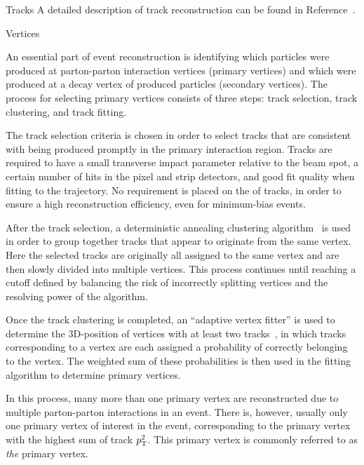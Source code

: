 \begin{section}{Tracks}
A detailed description of track reconstruction can be found in Reference~\cite{Chatrchyan:2014fea}.

\begin{subsection}{Vertices}

An essential part of event reconstruction is identifying which particles were produced at parton-parton interaction vertices (primary vertices) and which were produced at a decay vertex of produced particles (secondary vertices).
The process for selecting primary vertices consists of three steps: track selection, track clustering, and track fitting.

The track selection criteria is chosen in order to select tracks that are consistent with being produced promptly in the primary interaction region.
Tracks are required to have a small transverse impact parameter relative to the beam spot, a certain number of hits in the pixel and strip detectors, and good fit quality when fitting to the trajectory.
No requirement is placed on the \pT of tracks, in order to ensure a high reconstruction efficiency, even for minimum-bias events.

After the track selection, a deterministic annealing clustering algorithm~\cite{726788} is used in order to group together tracks that appear to originate from the same vertex.
Here the selected tracks are originally all assigned to the same vertex and are then slowly divided into multiple vertices.
This process continues until reaching a cutoff defined by balancing the risk of incorrectly splitting vertices and the resolving power of the algorithm.

Once the track clustering is completed, an ``adaptive vertex fitter'' is used to determine the 3D-position of vertices with at least two tracks~\cite{Fruhwirth:1027031}, in which tracks corresponding to a vertex are each assigned a probability of correctly belonging to the vertex.
The weighted sum of these probabilities is then used in the fitting algorithm to determine primary vertices.

In this process, many more than one primary vertex are reconstructed due to multiple parton-parton interactions in an event.
There is, however, usually only one primary vertex of interest in the event, corresponding to the primary vertex with the highest sum of track $p_{\mathrm{T}}^2$.
This primary vertex is commonly referred to as \textit{the} primary vertex.
 
\end{subsection}

\end{section}

